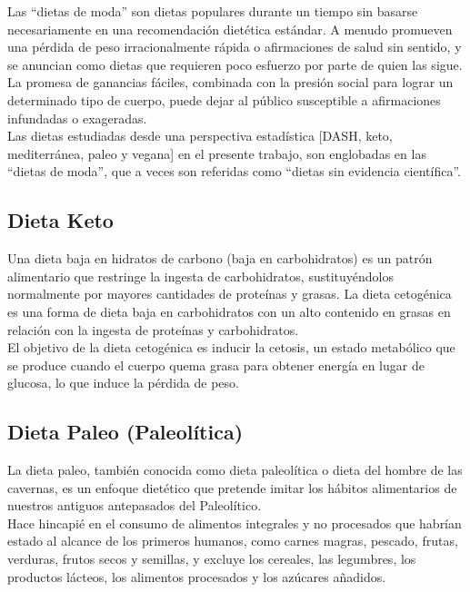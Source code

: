 \documentclass[12pt,a4paper]{article}
\begin{document}
Las ``dietas de moda'' son dietas populares durante un tiempo sin basarse 
necesariamente en una recomendación dietética estándar. A menudo promueven 
una pérdida de peso irracionalmente rápida o afirmaciones de salud sin 
sentido, y se anuncian como dietas que requieren poco esfuerzo por parte de 
quien las sigue. La promesa de ganancias fáciles, combinada con la presión 
social para lograr un determinado tipo de cuerpo, puede dejar al público 
susceptible a afirmaciones infundadas o exageradas.\cite{marvastipopular} \\

Las dietas estudiadas desde una perspectiva estadística	[DASH, keto, mediterránea, 
paleo y vegana] en el presente trabajo, son englobadas en las ``dietas de moda'', que 
a veces son referidas como ``dietas sin evidencia científica''.

\subsection{Dieta Keto}
\cite{marvastipopular} Una dieta baja en hidratos de carbono (baja en 
carbohidratos) es un patrón alimentario que restringe la ingesta de 
carbohidratos, sustituyéndolos normalmente por mayores cantidades de 
proteínas y grasas. La dieta cetogénica es una forma de dieta baja en 
carbohidratos con un alto contenido en grasas en relación con la ingesta 
de proteínas y carbohidratos.\\

El objetivo de la dieta cetogénica es inducir la cetosis, un estado 
metabólico que se produce cuando el cuerpo quema grasa para obtener 
energía en lugar de glucosa, lo que induce la pérdida de peso.

\subsection{Dieta Paleo (Paleolítica)}
\cite{marvastipopular} La dieta paleo, también conocida como dieta 
paleolítica o dieta del hombre de las cavernas, es un enfoque 
dietético que pretende imitar los hábitos alimentarios de nuestros 
antiguos antepasados del Paleolítico. \\

Hace hincapié en el consumo de alimentos integrales y no procesados 
que habrían estado al alcance de los primeros humanos, como carnes magras, 
pescado, frutas, verduras, frutos secos y semillas, y excluye los cereales, 
las legumbres, los productos lácteos, los alimentos procesados y los 
azúcares añadidos.

\newpage

\printbibliography[title={Referencias}]
\end{document}
